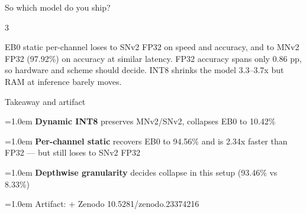 \documentclass[aspectratio=169]{beamer}
\newcommand{\srcline}[1]{%
  \noindent\hangindent=1.0em\hangafter=1
  \textcolor{oliveGreen}{\textbullet}\hspace{0.5em}#1\par}
\begin{document}
\begin{frame}{So which model do you ship?}


  \begin{stepflow}{3}
    \steparrow
    \steparrow
  \end{stepflow}

  \vspace{0.7em}
  {\small
  EB0 static per-channel loses to SNv2 FP32 on  speed and accuracy, and
  to MNv2 FP32 (97.92\%) on accuracy at similar latency. FP32 accuracy spans only
  0.86 pp, so hardware and scheme should decide. INT8 shrinks the model 3.3--3.7x
  but RAM at inference barely moves.\par}


\end{frame}


\begin{frame}{Takeaway and artifact}


  \srcline{\textbf{Dynamic INT8} preserves MNv2/SNv2, collapses EB0 to 10.42\%}
  \srcline{\textbf{Per-channel static} recovers EB0 to 94.56\% and is 2.34x faster than FP32 — but still loses to SNv2 FP32}
  \srcline{\textbf{Depthwise granularity} decides collapse in this setup (93.46\% vs 8.33\%)}
  \srcline{Artifact:  + Zenodo 10.5281/zenodo.23374216}


\end{frame}
\end{document}
